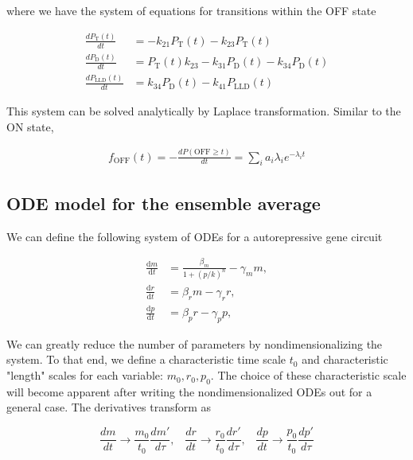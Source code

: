 \documentclass{ucetd}
\begin{document}
\begin{appendices}
where we have the system of equations for transitions within the OFF state

\begin{align*}
\frac{dP_{\mathrm{T}}(t)}{dt} &= -k_{21}P_{\mathrm{T}}(t) - k_{23}P_{\mathrm{T}}(t)\\
\frac{dP_{\mathrm{D}}(t)}{dt} &= P_{\mathrm{T}}(t)k_{23}-k_{31}P_{\mathrm{D}}(t) - k_{34}P_{\mathrm{D}}(t)\\
\frac{dP_{\mathrm{LLD}}(t)}{dt} &= k_{34}P_{\mathrm{D}}(t) - k_{41}P_{\mathrm{LLD}}(t)
\end{align*}

This system can be solved analytically by Laplace transformation. Similar to the ON state, 

\begin{align*}
f_{\mathrm{OFF}}(t) = -\frac{dP(\mathrm{OFF} \geq t)}{dt} = \sum_{i}a_{i}\lambda_{i}e^{-\lambda_{i}t}
\end{align*}


\subsection{ODE model for the ensemble average}

We can define the following system of ODEs for a autorepressive gene circuit

\begin{align}
\frac{\mathrm{d}m}{\mathrm{d}t} &= \frac{\beta_{m}}{1 + (p/k)^n} - \gamma_m m,\\[1em]
\frac{\mathrm{d}r}{\mathrm{d}t} &= \beta_{r} m - \gamma_r r,\\[1em]
\frac{\mathrm{d}p}{\mathrm{d}t} &= \beta_{p} r - \gamma_{p} p,
\end{align}

We can greatly reduce the number of parameters by nondimensionalizing the system. To that end, we define a characteristic time scale $t_{0}$ and characteristic "length" scales for each variable: $m_{0}, r_{0}, p_{0}$. The choice of these characteristic scale will become apparent after writing the nondimensionalized ODEs out for a general case. The derivatives transform as

\begin{equation*}
\frac{dm}{dt} \rightarrow \frac{m_{0}}{t_{0}}\frac{dm'}{d\tau}, \;\;\; \frac{dr}{dt} \rightarrow \frac{r_{0}}{t_{0}}\frac{dr'}{d\tau},  \;\;\; \frac{dp}{dt} \rightarrow \frac{p_{0}}{t_{0}}\frac{dp'}{d\tau} 
\end{equation*}


\end{appendices}
\end{document}

